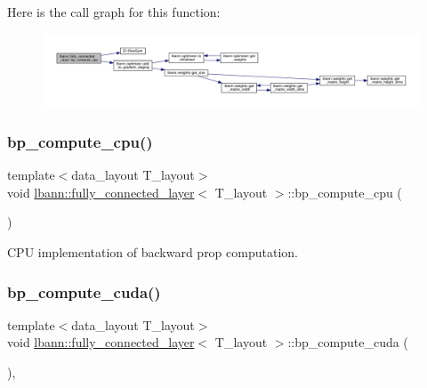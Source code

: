 Here is the call graph for this function\+:\nopagebreak
\begin{figure}[H]
\begin{center}
\leavevmode
\includegraphics[width=350pt]{classlbann_1_1fully__connected__layer_af65e177e5f2b1a1d2854a04b433f7dae_cgraph}
\end{center}
\end{figure}
\mbox{\label{classlbann_1_1fully__connected__layer_affbaa1ecb08e45ff6f9ab195227d0084}} 
\subsubsection{\texorpdfstring{bp\+\_\+compute\+\_\+cpu()}{bp\_compute\_cpu()}\hspace{0.1cm}{\footnotesize\ttfamily [3/3]}}
{\footnotesize\ttfamily template$<$data\+\_\+layout T\+\_\+layout$>$ \\
void \hyperlink{classlbann_1_1fully__connected__layer}{lbann\+::fully\+\_\+connected\+\_\+layer}$<$ T\+\_\+layout $>$\+::bp\+\_\+compute\+\_\+cpu (\begin{DoxyParamCaption}{ }\end{DoxyParamCaption})\hspace{0.3cm}{\ttfamily [private]}}

C\+PU implementation of backward prop computation. \mbox{\label{classlbann_1_1fully__connected__layer_a521aa4a5b88ef00f554fe21a850f6596}} 
\subsubsection{\texorpdfstring{bp\+\_\+compute\+\_\+cuda()}{bp\_compute\_cuda()}}
{\footnotesize\ttfamily template$<$data\+\_\+layout T\+\_\+layout$>$ \\
void \hyperlink{classlbann_1_1fully__connected__layer}{lbann\+::fully\+\_\+connected\+\_\+layer}$<$ T\+\_\+layout $>$\+::bp\+\_\+compute\+\_\+cuda (\begin{DoxyParamCaption}{ }\end{DoxyParamCaption})\hspace{0.3cm}{\ttfamily [inline]}, {\ttfamily [private]}}

